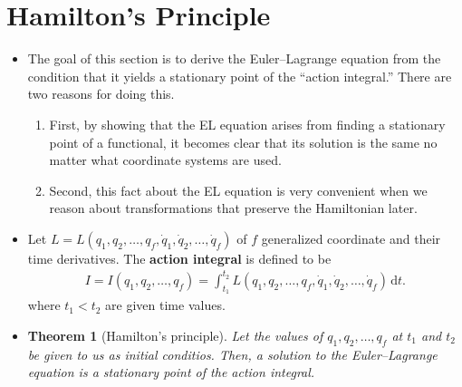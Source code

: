 \documentclass[10pt]{article}
\newtheorem{theorem}[lemma]{Theorem}
\newcommand{\dee}{\mathrm{d}}
\begin{document}
  \section{Hamilton's Principle} \label{sec:hamilton-principle}

  \begin{itemize}
  	\item The goal of this section is to derive the Euler--Lagrange equation from the condition that it yields a stationary point of the ``action integral.'' There are two reasons for doing this.
  	\begin{enumerate}
  		\item First, by showing that the EL equation arises from finding a stationary point of a functional, it becomes clear that its solution is the same no matter what coordinate systems are used.

  		\item Second, this fact about the EL equation is very convenient when we reason about transformations that preserve the Hamiltonian later.
  	\end{enumerate}

  	\item Let $L = L(q_1, q_2, \dots, q_f, \dot{q}_1, \dot{q}_2, \dotsc, \dot{q}_f)$ of $f$ generalized coordinate and their time derivatives. The {\bf action integral} is defined to be
  	\begin{align*}
  		I = I(q_1, q_2, \dots, q_f) = \int_{t_1}^{t_2} L(q_1, q_2, \dots, q_f, \dot{q}_1, \dot{q}_2, \dotsc, \dot{q}_f)\, \dee t.
  	\end{align*}
  	where $t_1 < t_2$ are given time values. 

  	\item \begin{theorem}[Hamilton's principle] Let the values of $q_1, q_2, \dotsc, q_f$ at $t_1$ and $t_2$ be given to us as initial conditios. Then, a solution to the Euler--Lagrange equation is a stationary point of the action integral.
  	\end{theorem}


\end{itemize}
\end{document}

